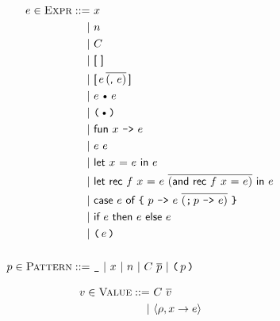 \documentclass{article}
\def\code#1{\textsf{#1}}
\def\por{\ | \ }
\def\binop{\, \text{\textbullet}\, }
\def\closure#1#2#3{\langle #3 , #1 \to #2\rangle}
\begin{document}
\begin{align*}
e \in \textsc{Expr} ::= \ & x \\
\por & n \\
\por & C \\
\por & \code{[ ]}\\
\por & \code{[}\,e\,\overline{(\code{,}\ e)}\,\code{]}\\
\por & e \binop e\\
\por & \texttt{($\binop$)}\\
\por & \code{fun $x$ \texttt{->} $e$}\\
\por & e \ e\\
\por & \code{let $x$ = $e$ in $e$}\\
\por & \code{let rec $f$ $x$ = $e$ }\overline{(\code{and rec $f$ $x$ = $e$})}\code{ in $e$}\\
\por & \code{case $e$ of }\texttt{\char`\{} \ \code{$p$ \texttt{->} $e$}\ \overline{( \texttt{;} \, \code{$p$ \texttt{->} $e$})} \ \texttt{\char`\}}\\
\por & \code{if $e$ then $e$ else $e$}\\
\por & \texttt{($\, e \,$)}\\\\
p \in \textsc{Pattern} ::= \ & \texttt{\_} \por x \por n \por C \ \overline{p} \por \texttt{($\, p\,$)}
%
%
\end{align*}

\begin{align*}
v\in \textsc{Value}::= \ & C \ \overline{v} \\
\por & \closure x e \rho
\end{align*}

\end{document}
